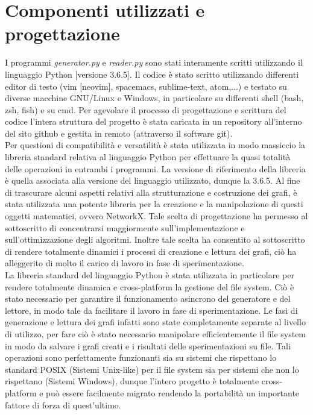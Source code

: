 \section{Componenti utilizzati e progettazione}
\justify
I programmi \textit{generator.py} e \textit{reader.py} sono stati interamente scritti utilizzando il linguaggio Python [versione 3.6.5]. Il codice è stato scritto utilizzando differenti editor di testo (vim [neovim], spacemacs, sublime-text, atom,...) e testato su diverse macchine GNU/Linux e Windows, in particolare su differenti shell (bash, zsh, fish) e su cmd. Per agevolare il processo di progettazione e scrittura del codice l'intera struttura del progetto è stata caricata in un repository all'interno del sito github e gestita in remoto (attraverso il software git).\\
Per questioni di compatibilità e versatilità è stata utilizzata in modo massiccio la libreria standard relativa al linguaggio Python per effettuare la quasi totalità delle operazioni in entrambi i programmi. La versione di riferimento della libreria è quella associata alla versione del linguaggio utilizzato, dunque la 3.6.5. Al fine di trascurare alcuni aspetti relativi alla strutturazione e costruzione dei grafi, è stata utilizzata una potente libreria per la creazione e la manipolazione di questi oggetti matematici, ovvero NetworkX. Tale scelta di progettazione ha permesso al sottoscritto di concentrarsi maggiormente sull'implementazione e sull'ottimizzazione degli algoritmi. Inoltre tale scelta ha consentito al sottoscritto di rendere totalmente dinamici i processi di creazione e lettura dei grafi, ciò ha alleggerito di molto il carico di lavoro in fase di sperimentazione.\\
La libreria standard del linguaggio Python è stata utilizzata in particolare per rendere totalmente dinamica e cross-platform la gestione del file system. Ciò è stato necessario per garantire il funzionamento asincrono del generatore e del lettore, in modo tale da facilitare il lavoro in fase di sperimentazione. Le fasi di generazione e lettura dei grafi infatti sono state completamente separate al livello di utilizzo, per fare ciò è stato necessario manipolare efficientemente il file system in modo da salvare i grafi creati e i risultati delle sperimentazioni su file. Tali operazioni sono perfettamente funzionanti sia su sistemi che rispettano lo standard POSIX (Sistemi Unix-like) per il file system sia per sistemi che non lo rispettano (Sistemi Windows), dunque l'intero progetto è totalmente cross-platform e può essere facilmente migrato rendendo la portabilità un importante fattore di forza di quest'ultimo.\\
